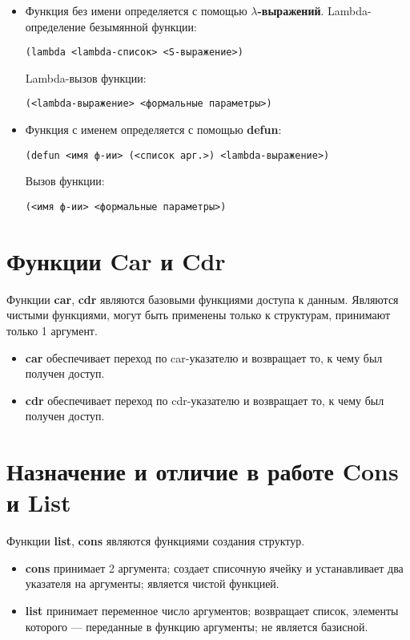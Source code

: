 \begin{itemize}
	\item Функция без имени определяется с помощью \textbf{$\lambda$-выражений}. 
	Lambda-определение безымянной функции:
	\begin{center}
		\texttt{(lambda <lambda-список> <S-выражение>)}
	\end{center}
	
	Lambda-вызов функции:
	\begin{center}
		\texttt{(<lambda-выражение> <формальные параметры>)}
	\end{center}
	
	\item Функция с именем определяется с помощью \textbf{defun}:
	\begin{center}
		\texttt{(defun <имя ф-ии> (<список арг.>) <lambda-выражение>)}
	\end{center}
	
	Вызов функции:
	\begin{center}
		\texttt{(<имя ф-ии> <формальные параметры>)}
	\end{center}
	
\end{itemize}

\section{Функции Car и Cdr}

Функции \textbf{car}, \textbf{cdr} являются базовыми функциями доступа к данным. Являются чистыми функциями, могут быть применены только к структурам, принимают только 1 аргумент.

\begin{itemize}
	\item \textbf{car} обеспечивает переход по car-указателю и возвращает то, к чему был получен доступ. 
	\item \textbf{cdr} обеспечивает переход по cdr-указателю и возвращает то, к чему был получен доступ.
\end{itemize}

\section{Назначение и отличие в работе Cons и List}

Функции \textbf{list}, \textbf{cons} являются функциями создания структур. 

\begin{itemize}
	\item \textbf{cons} принимает 2 аргумента; создает списочную ячейку и устанавливает два указателя на аргументы; является чистой функцией.
	
	\item \textbf{list} принимает переменное число аргументов; возвращает список, элементы которого --- переданные в функцию аргументы; не является базисной.
	
\end{itemize} 